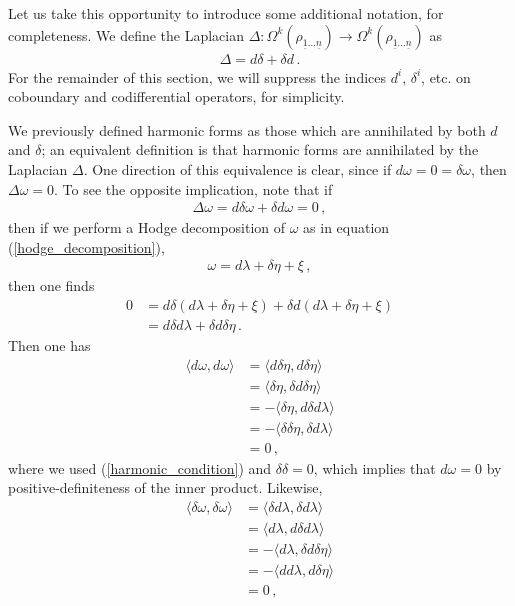 \documentclass[12pt]{article}
\newcommand{\ul}[1]{{\underline{#1}}}
\numberwithin{equation}{section}
\newcommand{\rhooneton}{{\rho_{\ul{1} \ldots \ul{n}}}}
\begin{document}
Let us take this opportunity to introduce some additional notation, for completeness. We define the Laplacian $\Delta : \Omega^k ( \rhooneton ) \to \Omega^k ( \rhooneton )$ as
%
\begin{align}
    \Delta = d \delta + \delta d \, .
\end{align}
%
For the remainder of this section, we will suppress the indices $d^{i}$, $\delta^{i}$, etc. on coboundary and codifferential operators, for simplicity.

We previously defined harmonic forms as those which are annihilated by both $d$ and $\delta$; an equivalent definition is that harmonic forms are annihilated by the Laplacian $\Delta$. One direction of this equivalence is clear, since if $d \omega = 0 = \delta \omega$, then $\Delta \omega = 0$. To see the opposite implication, note that if
%
\begin{align}
    \Delta \omega = d \delta \omega + \delta d \omega = 0 \, ,
\end{align}
%
then if we perform a Hodge decomposition of $\omega$ as in equation (\ref{hodge_decomposition}),
%
\begin{align}
    \omega = d \lambda + \delta \eta + \xi \, ,
\end{align}
%
then one finds
%
\begin{align}\label{harmonic_condition}
    0 &= d \delta \left( d \lambda + \delta \eta + \xi \right) + \delta d \left( d \lambda + \delta \eta + \xi \right) \nonumber \\
    &= d \delta d \lambda + \delta d \delta \eta \, .
\end{align}
%
Then one has
%
\begin{align}
    \langle d \omega, d \omega \rangle &= \langle d \delta \eta , d \delta \eta \rangle \nonumber \\
    &= \langle \delta \eta, \delta d \delta \eta \rangle \nonumber \\
    &= - \langle \delta \eta, d \delta d \lambda \rangle \nonumber \\
    &= - \langle \delta \delta \eta, \delta d \lambda \rangle \nonumber \\
    &= 0 \, ,
\end{align}
%
where we used (\ref{harmonic_condition}) and $\delta \delta = 0$, which implies that $d \omega = 0$ by positive-definiteness of the inner product. Likewise,
%
\begin{align}
    \langle \delta \omega, \delta \omega \rangle &= \langle \delta d \lambda, \delta d \lambda \rangle \nonumber \\
    &= \langle d \lambda, d \delta d \lambda \rangle \nonumber \\
    &= - \langle d \lambda, \delta d \delta \eta \rangle \nonumber \\
    &= - \langle d d \lambda, d \delta \eta \rangle \nonumber \\
    &= 0 \, ,
\end{align}
\end{document}
